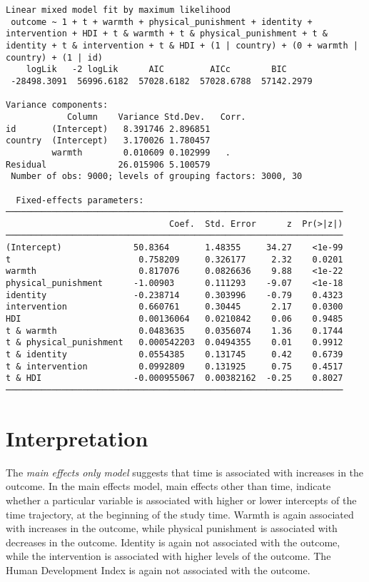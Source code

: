 \documentclass[
  letterpaper,
  DIV=11,
  numbers=noendperiod]{scrreprt}
\begin{document}
\begin{verbatim}
Linear mixed model fit by maximum likelihood
 outcome ~ 1 + t + warmth + physical_punishment + identity + intervention + HDI + t & warmth + t & physical_punishment + t & identity + t & intervention + t & HDI + (1 | country) + (0 + warmth | country) + (1 | id)
    logLik   -2 logLik      AIC         AICc        BIC     
 -28498.3091  56996.6182  57028.6182  57028.6788  57142.2979

Variance components:
            Column    Variance Std.Dev.   Corr.
id       (Intercept)   8.391746 2.896851
country  (Intercept)   3.170026 1.780457
         warmth        0.010609 0.102999   .  
Residual              26.015906 5.100579
 Number of obs: 9000; levels of grouping factors: 3000, 30

  Fixed-effects parameters:
──────────────────────────────────────────────────────────────────
                                Coef.  Std. Error      z  Pr(>|z|)
──────────────────────────────────────────────────────────────────
(Intercept)              50.8364       1.48355     34.27    <1e-99
t                         0.758209     0.326177     2.32    0.0201
warmth                    0.817076     0.0826636    9.88    <1e-22
physical_punishment      -1.00903      0.111293    -9.07    <1e-18
identity                 -0.238714     0.303996    -0.79    0.4323
intervention              0.660761     0.30445      2.17    0.0300
HDI                       0.00136064   0.0210842    0.06    0.9485
t & warmth                0.0483635    0.0356074    1.36    0.1744
t & physical_punishment   0.000542203  0.0494355    0.01    0.9912
t & identity              0.0554385    0.131745     0.42    0.6739
t & intervention          0.0992809    0.131925     0.75    0.4517
t & HDI                  -0.000955067  0.00382162  -0.25    0.8027
──────────────────────────────────────────────────────────────────
\end{verbatim}

\section{Interpretation}\label{interpretation-3}

The \emph{main effects only model} suggests that time is associated with
increases in the outcome. In the main effects model, main effects other
than time, indicate whether a particular variable is associated with
higher or lower intercepts of the time trajectory, at the beginning of
the study time. Warmth is again associated with increases in the
outcome, while physical punishment is associated with decreases in the
outcome. Identity is again not associated with the outcome, while the
intervention is associated with higher levels of the outcome. The Human
Development Index is again not associated with the outcome.
\end{document}
